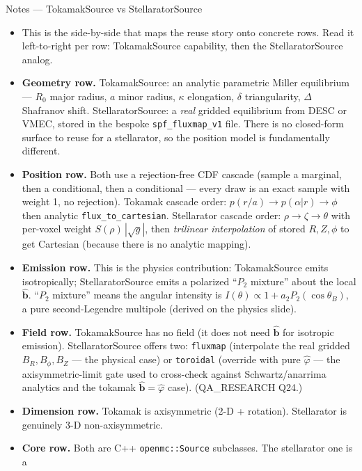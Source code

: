 \documentclass[11pt,aspectratio=169]{beamer}
\newcommand{\bhat}{\hat{\mathbf{b}}}
\begin{document}
\begin{frame}[allowframebreaks]{Notes --- TokamakSource vs StellaratorSource}
{\color{red}\footnotesize
\begin{itemize}
\item This is the side-by-side that maps the reuse story onto concrete rows. Read it left-to-right
      per row: TokamakSource capability, then the StellaratorSource analog.
\item \textbf{Geometry row.} TokamakSource: an analytic parametric Miller equilibrium ---
      $R_0$ major radius, $a$ minor radius, $\kappa$ elongation, $\delta$ triangularity,
      $\Delta$ Shafranov shift. StellaratorSource: a \emph{real} gridded equilibrium from
      DESC or VMEC, stored in the bespoke \texttt{spf\_fluxmap\_v1} file. There is no closed-form
      surface to reuse for a stellarator, so the position model is fundamentally different.
\item \textbf{Position row.} Both use a rejection-free CDF cascade (sample a marginal, then a
      conditional, then a conditional --- every draw is an exact sample with weight 1, no
      rejection). Tokamak cascade order: $p(r/a)\!\to\!p(\alpha|r)\!\to\!\phi$ then analytic
      \texttt{flux\_to\_cartesian}. Stellarator cascade order: $\rho\!\to\!\zeta\!\to\!\theta$
      with per-voxel weight $S(\rho)\,|\sqrt{g}|$, then \emph{trilinear interpolation} of stored
      $R,Z,\phi$ to get Cartesian (because there is no analytic mapping).
\item \textbf{Emission row.} This is the physics contribution: TokamakSource emits isotropically;
      StellaratorSource emits a polarized ``$P_2$ mixture'' about the local $\bhat$. ``$P_2$
      mixture'' means the angular intensity is $I(\theta)\propto 1 + a_2 P_2(\cos\theta_B)$, a
      pure second-Legendre multipole (derived on the physics slide).
\item \textbf{Field row.} TokamakSource has no field (it does not need $\bhat$ for isotropic
      emission). StellaratorSource offers two: \texttt{fluxmap} (interpolate the real gridded
      $B_R,B_\phi,B_Z$ --- the physical case) or \texttt{toroidal} (override with pure
      $\hat\varphi$ --- the axisymmetric-limit gate used to cross-check against Schwartz/anarrima
      analytics and the tokamak $\bhat=\hat\varphi$ case). (QA\_RESEARCH Q24.)
\item \textbf{Dimension row.} Tokamak is axisymmetric (2-D + rotation). Stellarator is genuinely
      3-D non-axisymmetric.
\item \textbf{Core row.} Both are C++ \texttt{openmc::Source} subclasses. The stellarator one is a

\end{itemize}}
\end{frame}
\end{document}
